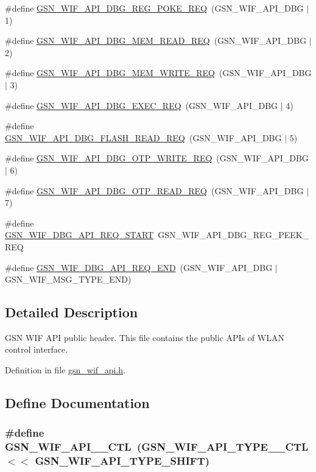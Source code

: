 \begin{DoxyCompactItemize}
\#define \hyperlink{a00606_aab1f1b84f54eb7e095cccb3230190801}{GSN\_\-WIF\_\-API\_\-DBG\_\-REG\_\-POKE\_\-REQ}~(GSN\_\-WIF\_\-API\_\-DBG $|$ 1)
\item 
\#define \hyperlink{a00606_a6bcd7953e56bfbba85dd70749c2bdf53}{GSN\_\-WIF\_\-API\_\-DBG\_\-MEM\_\-READ\_\-REQ}~(GSN\_\-WIF\_\-API\_\-DBG $|$ 2)
\item 
\#define \hyperlink{a00606_ac5cf169380b5ecfbecccd7485cc52417}{GSN\_\-WIF\_\-API\_\-DBG\_\-MEM\_\-WRITE\_\-REQ}~(GSN\_\-WIF\_\-API\_\-DBG $|$ 3)
\item 
\#define \hyperlink{a00606_a01c1d35b5f839c25f87a9e93b948cd11}{GSN\_\-WIF\_\-API\_\-DBG\_\-EXEC\_\-REQ}~(GSN\_\-WIF\_\-API\_\-DBG $|$ 4)
\item 
\#define \hyperlink{a00606_a0aaa70b34aba81a71b8bde80f389cbd0}{GSN\_\-WIF\_\-API\_\-DBG\_\-FLASH\_\-READ\_\-REQ}~(GSN\_\-WIF\_\-API\_\-DBG $|$ 5)
\item 
\#define \hyperlink{a00606_a11de83e81df9fc11e0ec10df5b8ac7d2}{GSN\_\-WIF\_\-API\_\-DBG\_\-OTP\_\-WRITE\_\-REQ}~(GSN\_\-WIF\_\-API\_\-DBG $|$ 6)
\item 
\#define \hyperlink{a00606_ab417c596bf5f77e5ebc3e01b5be56201}{GSN\_\-WIF\_\-API\_\-DBG\_\-OTP\_\-READ\_\-REQ}~(GSN\_\-WIF\_\-API\_\-DBG $|$ 7)
\item 
\#define \hyperlink{a00606_ab5ab029cd4620155e8f98abad7c49f98}{GSN\_\-WIF\_\-DBG\_\-API\_\-REQ\_\-START}~GSN\_\-WIF\_\-API\_\-DBG\_\-REG\_\-PEEK\_\-REQ
\item 
\#define \hyperlink{a00606_af92c532000365e8a7291db06368cc886}{GSN\_\-WIF\_\-DBG\_\-API\_\-REQ\_\-END}~(GSN\_\-WIF\_\-API\_\-DBG $|$ GSN\_\-WIF\_\-MSG\_\-TYPE\_\-END)
\end{DoxyCompactItemize}


\subsection{Detailed Description}
GSN WIF API public header. This file contains the public APIs of WLAN control interface. 

Definition in file \hyperlink{a00606_source}{gsn\_\-wif\_\-api.h}.



\subsection{Define Documentation}
\hypertarget{a00606_a4fd6f523cdc97966a77e03a064afec4d}{
\subsubsection[{GSN\_\-WIF\_\-API\_\-154\_\-CTL}]{\setlength{\rightskip}{0pt plus 5cm}\#define GSN\_\-WIF\_\-API\_\_\-CTL~(GSN\_\-WIF\_\-API\_\-TYPE\_\_\-CTL $<$$<$ GSN\_\-WIF\_\-API\_\-TYPE\_\-SHIFT)}}
\label{a00606_a4fd6f523cdc97966a77e03a064afec4d}


